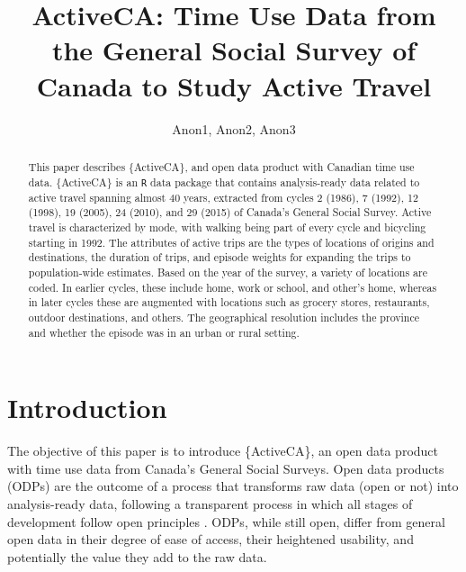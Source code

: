 \documentclass[Royal,times,sageh]{sagej}
\begin{document}

\title{ActiveCA: Time Use Data from the General Social Survey of Canada
to Study Active Travel}

\runninghead{}

\author{Anon1\affilnum{}, Anon2\affilnum{}, Anon3\affilnum{}}

\affiliation{\affilnum{}{}}



\begin{abstract}
This paper describes \{ActiveCA\}, and open data product with Canadian
time use data. \{ActiveCA\} is an \texttt{R} data package that contains
analysis-ready data related to active travel spanning almost 40 years,
extracted from cycles 2 (1986), 7 (1992), 12 (1998), 19 (2005), 24
(2010), and 29 (2015) of Canada's General Social Survey. Active travel
is characterized by mode, with walking being part of every cycle and
bicycling starting in 1992. The attributes of active trips are the types
of locations of origins and destinations, the duration of trips, and
episode weights for expanding the trips to population-wide estimates.
Based on the year of the survey, a variety of locations are coded. In
earlier cycles, these include home, work or school, and other's home,
whereas in later cycles these are augmented with locations such as
grocery stores, restaurants, outdoor destinations, and others. The
geographical resolution includes the province and whether the episode
was in an urban or rural setting.
\end{abstract}


\maketitle

\section{Introduction}\label{introduction}

The objective of this paper is to introduce \{ActiveCA\}, an open data
product with time use data from Canada's General Social Surveys. Open
data products (ODPs) are the outcome of a process that transforms raw
data (open or not) into analysis-ready data, following a transparent
process in which all stages of development follow open principles
\citep{arribas-bel2021}. ODPs, while still open, differ from general
open data in their degree of ease of access, their heightened usability,
and potentially the value they add to the raw data.
\end{document}
